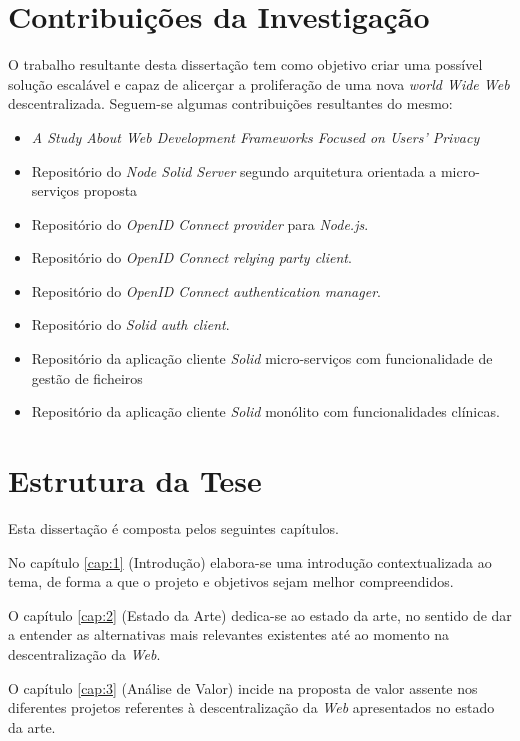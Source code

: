\section{Contribuições da Investigação \label{section_contribuicoes_investigacao}}
O trabalho resultante desta dissertação tem como objetivo criar uma possível solução escalável e capaz de alicerçar a proliferação de uma nova \emph{world Wide Web} descentralizada. Seguem-se algumas contribuições resultantes do mesmo:
\begin{itemize}
    \item \emph{A Study About Web Development Frameworks Focused on Users’ Privacy}\cite{solid_article}
    \item Repositório do \emph{Node Solid Server} segundo arquitetura orientada a micro-serviços proposta\cite{repo_node_solid_server}
    \item Repositório do \emph{OpenID Connect provider} para \emph{Node.js}\cite{repo_oidc_op}.
    \item Repositório do \emph{OpenID Connect relying party client}\cite{repo_oidc_rp}.
    \item Repositório do \emph{OpenID Connect authentication manager}\cite{repo_oidc_auth_manager}.
    \item Repositório do \emph{Solid auth client}\cite{repo_solid_auth_client}.
    \item Repositório da aplicação cliente \emph{Solid} micro-serviços com funcionalidade de gestão de ficheiros\cite{repo_solid_filemanager}
    \item Repositório da aplicação cliente \emph{Solid} monólito com funcionalidades clínicas\cite{repo_steve_clinic}.
\end{itemize}

\section{Estrutura da Tese}

Esta dissertação é composta pelos seguintes capítulos.

No capítulo \ref{cap:1} (Introdução) elabora-se uma introdução contextualizada ao tema, de forma a que o projeto e objetivos sejam melhor compreendidos.

O capítulo \ref{cap:2} (Estado da Arte) dedica-se ao estado da arte, no sentido de dar a entender as alternativas mais relevantes existentes até ao momento na descentralização da \emph{Web}.

O capítulo \ref{cap:3} (Análise de Valor) incide na proposta de valor assente nos diferentes projetos referentes à descentralização da \emph{Web} apresentados no estado da arte.

